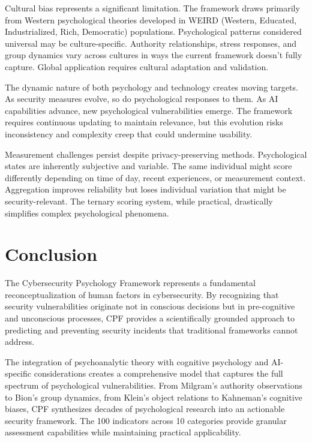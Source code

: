\documentclass[11pt,a4paper]{article}
\begin{document}
Cultural bias represents a significant limitation. The framework draws primarily from Western psychological theories developed in WEIRD (Western, Educated, Industrialized, Rich, Democratic) populations. Psychological patterns considered universal may be culture-specific. Authority relationships, stress responses, and group dynamics vary across cultures in ways the current framework doesn't fully capture. Global application requires cultural adaptation and validation.

The dynamic nature of both psychology and technology creates moving targets. As security measures evolve, so do psychological responses to them. As AI capabilities advance, new psychological vulnerabilities emerge. The framework requires continuous updating to maintain relevance, but this evolution risks inconsistency and complexity creep that could undermine usability.

Measurement challenges persist despite privacy-preserving methods. Psychological states are inherently subjective and variable. The same individual might score differently depending on time of day, recent experiences, or measurement context. Aggregation improves reliability but loses individual variation that might be security-relevant. The ternary scoring system, while practical, drastically simplifies complex psychological phenomena.

\section{Conclusion}

The Cybersecurity Psychology Framework represents a fundamental reconceptualization of human factors in cybersecurity. By recognizing that security vulnerabilities originate not in conscious decisions but in pre-cognitive and unconscious processes, CPF provides a scientifically grounded approach to predicting and preventing security incidents that traditional frameworks cannot address.

The integration of psychoanalytic theory with cognitive psychology and AI-specific considerations creates a comprehensive model that captures the full spectrum of psychological vulnerabilities. From Milgram's authority observations to Bion's group dynamics, from Klein's object relations to Kahneman's cognitive biases, CPF synthesizes decades of psychological research into an actionable security framework. The 100 indicators across 10 categories provide granular assessment capabilities while maintaining practical applicability.
\end{document}

